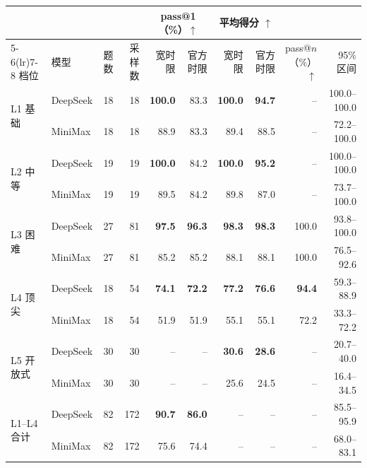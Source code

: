 \begin{tabular}{llrrrrrrrr}
\toprule
 & & & & \multicolumn{2}{c}{pass@1（\%）$\uparrow$} & \multicolumn{2}{c}{平均得分 $\uparrow$} & & \\
\cmidrule(lr){5-6}\cmidrule(lr){7-8}
档位 & 模型 & 题数 & 采样数 & 宽时限 & 官方时限 & 宽时限 & 官方时限 & pass@$n$（\%）$\uparrow$ & 95\% 区间 \\
\midrule
\multirow{2}{*}{L1 基础} & DeepSeek & 18 & 18 & \textbf{100.0} & 83.3 & \textbf{100.0} & \textbf{94.7} & -- & {\scriptsize\color{gray}100.0--100.0} \\
 & MiniMax & 18 & 18 & 88.9 & 83.3 & 89.4 & 88.5 & -- & {\scriptsize\color{gray}72.2--100.0} \\
\midrule
\multirow{2}{*}{L2 中等} & DeepSeek & 19 & 19 & \textbf{100.0} & 84.2 & \textbf{100.0} & \textbf{95.2} & -- & {\scriptsize\color{gray}100.0--100.0} \\
 & MiniMax & 19 & 19 & 89.5 & 84.2 & 89.8 & 87.0 & -- & {\scriptsize\color{gray}73.7--100.0} \\
\midrule
\multirow{2}{*}{L3 困难} & DeepSeek & 27 & 81 & \textbf{97.5} & \textbf{96.3} & \textbf{98.3} & \textbf{98.3} & 100.0 & {\scriptsize\color{gray}93.8--100.0} \\
 & MiniMax & 27 & 81 & 85.2 & 85.2 & 88.1 & 88.1 & 100.0 & {\scriptsize\color{gray}76.5--92.6} \\
\midrule
\multirow{2}{*}{L4 顶尖} & DeepSeek & 18 & 54 & \textbf{74.1} & \textbf{72.2} & \textbf{77.2} & \textbf{76.6} & \textbf{94.4} & {\scriptsize\color{gray}59.3--88.9} \\
 & MiniMax & 18 & 54 & 51.9 & 51.9 & 55.1 & 55.1 & 72.2 & {\scriptsize\color{gray}33.3--72.2} \\
\midrule
\multirow{2}{*}{L5 开放式} & DeepSeek & 30 & 30 & -- & -- & \textbf{30.6} & \textbf{28.6} & -- & {\scriptsize\color{gray}20.7--40.0} \\
 & MiniMax & 30 & 30 & -- & -- & 25.6 & 24.5 & -- & {\scriptsize\color{gray}16.4--34.5} \\
\midrule
\multirow{2}{*}{L1--L4 合计} & DeepSeek & 82 & 172 & \textbf{90.7} & \textbf{86.0} & -- & -- & -- & {\scriptsize\color{gray}85.5--95.9} \\
 & MiniMax & 82 & 172 & 75.6 & 74.4 & -- & -- & -- & {\scriptsize\color{gray}68.0--83.1} \\
\bottomrule
\end{tabular}
